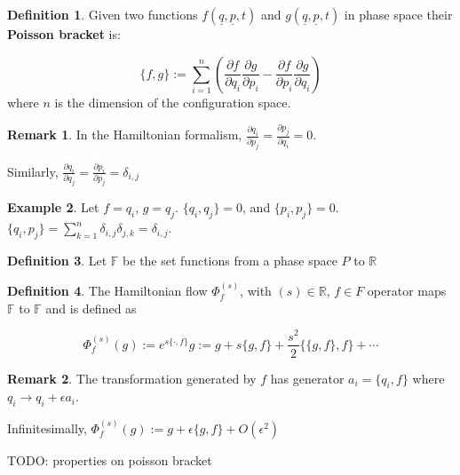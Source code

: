 \documentclass[12pt,a4paper]{article}
\theoremstyle{definition}
\newtheorem{definition}{Definition}[subsection]
\newtheorem{example}[definition]{Example}
\newtheorem*{remark}{Remark}
\begin{document}
\begin{definition}
	Given two functions $f(\underline{q}, \underline{p}, t)$ and $g(\underline{q}, \underline{p}, t)$ in phase space their \textbf{Poisson bracket} is:

	\[ \{f, g\} := \sum_{i = 1}^n \left( \frac{\partial f}{\partial q_i} \frac{\partial g}{\partial p_i} - \frac{\partial f}{\partial p_i} \frac{\partial g}{\partial q_i} \right)\] where $n$ is the dimension of the configuration space.
\end{definition}

\begin{remark}
	In the Hamiltonian formalism, $\frac{\partial q_i}{\partial p_j} = \frac{\partial p_j}{\partial q_i} = 0$.

	Similarly, $\frac{\partial q_i}{\partial q_j} = \frac{\partial p_i}{\partial p_j} = \delta_{i, j}$
\end{remark}

\begin{example}
	Let $f = q_i$, $g = q_j$. $\{q_i, q_j\} = 0$, and $\{p_i, p_j\} = 0$. $\{q_i, p_j\} = \sum_{k = 1}^n \delta_{i, j} \delta_{j, k} = \delta_{i, j}$.
\end{example}

\begin{definition}
	Let $\mathbb{F}$ be the set functions from a phase space $P$ to $\mathbb{R}$
\end{definition}

\begin{definition}
	The Hamiltonian flow $\Phi_f^{(s)}$, with $(s) \in \mathbb{R}$, $f \in F$ operator maps $\mathbb{F}$ to $\mathbb{F}$ and is defined as

	\[ \Phi_f^{(s)} (g) := e^{s \{\cdot, f\}} g := g + s \{g, f\} + \frac{s^2}{2} \{ \{g, f\}, f\} + \cdots \]
\end{definition}

\begin{remark}
	The transformation generated by $f$ has generator $a_i = \{q_i, f\}$ where $q_i \rightarrow q_i + \epsilon a_i$.

	Infinitesimally, $\Phi_f^{(s)} (g) := g + \epsilon \{g, f\} + O(\epsilon^2)$
\end{remark}

TODO: properties on poisson bracket
\end{document}
